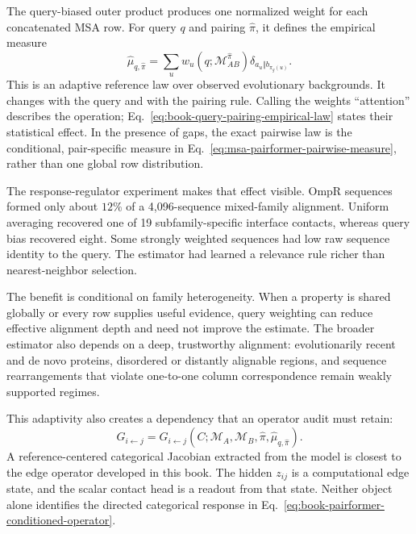The query-biased outer product produces one normalized weight for each concatenated MSA row.  For
query $q$ and pairing $\widehat\pi$, it defines the empirical measure
\begin{equation}
\widehat\mu_{q,\widehat\pi}
=\sum_u w_u(q;\mathcal M_{AB}^{\widehat\pi})
\delta_{a_u\Vert b_{\widehat\pi_g(u)}}.
\label{eq:book-query-pairing-empirical-law}
\end{equation}
This is an adaptive reference law over observed evolutionary backgrounds.  It changes with the
query and with the pairing rule.  Calling the weights ``attention'' describes the operation;
Eq.~\ref{eq:book-query-pairing-empirical-law} states their statistical effect.  In the presence of
gaps, the exact pairwise law is the conditional, pair-specific measure in
Eq.~\ref{eq:msa-pairformer-pairwise-measure}, rather than one global row distribution.

The response-regulator experiment makes that effect visible.  OmpR sequences formed only about
$12\%$ of a 4,096-sequence mixed-family alignment.  Uniform averaging recovered one of 19
subfamily-specific interface contacts, whereas query bias recovered eight.  Some strongly weighted
sequences had low raw sequence identity to the query.  The estimator had learned a relevance rule
richer than nearest-neighbor selection.

The benefit is conditional on family heterogeneity.  When a property is shared globally or every
row supplies useful evidence, query weighting can reduce effective alignment depth and need not
improve the estimate.  The broader estimator also depends on a deep, trustworthy alignment:
evolutionarily recent and de novo proteins, disordered or distantly alignable regions, and sequence
rearrangements that violate one-to-one column correspondence remain weakly supported regimes.

This adaptivity also creates a dependency that an operator audit must retain:
\begin{equation}
G_{i\leftarrow j}
=G_{i\leftarrow j}
\left(C;\mathcal M_A,\mathcal M_B,\widehat\pi,
\widehat\mu_{q,\widehat\pi}\right).
\label{eq:book-pairformer-conditioned-operator}
\end{equation}
A reference-centered categorical Jacobian extracted from the model is closest to the edge operator
developed in this book.  The hidden $z_{ij}$ is a computational edge state, and the scalar contact
head is a readout from that state.  Neither object alone identifies the directed categorical
response in Eq.~\ref{eq:book-pairformer-conditioned-operator}.

